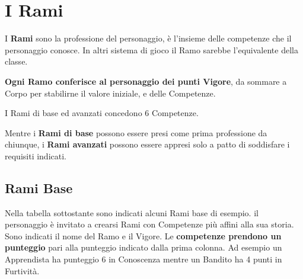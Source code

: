\documentclass[12pt,a4paper,twoside,openany]{book}
\begin{document}
\pagebreak


\section{I Rami}

\begin{multicols}{2}

I \textbf{Rami} sono la professione del personaggio, è l'insieme delle competenze che il personaggio conosce. In altri sistema di gioco il Ramo sarebbe l'equivalente della classe.

\textbf{Ogni Ramo conferisce al personaggio dei punti Vigore}, da sommare a Corpo per stabilirne il valore iniziale, e delle Competenze.

I Rami di base ed avanzati concedono 6 Competenze.

Mentre i \textbf{Rami di base} possono essere presi come prima professione da chiunque, i\textbf{ Rami avanzati} possono essere appresi solo a patto di soddisfare i requisiti indicati.

\subsection{Rami Base}

Nella tabella sottostante sono indicati alcuni Rami base di esempio. il personaggio è invitato a crearsi Rami con Competenze più affini alla sua storia.
Sono indicati il nome del Ramo e il Vigore. Le \textbf{competenze prendono un punteggio} pari alla punteggio indicato dalla prima colonna. Ad esempio un Apprendista ha punteggio 6 in Conoscenza mentre un Bandito ha 4 punti in Furtività.

\end{multicols}
\end{document}
